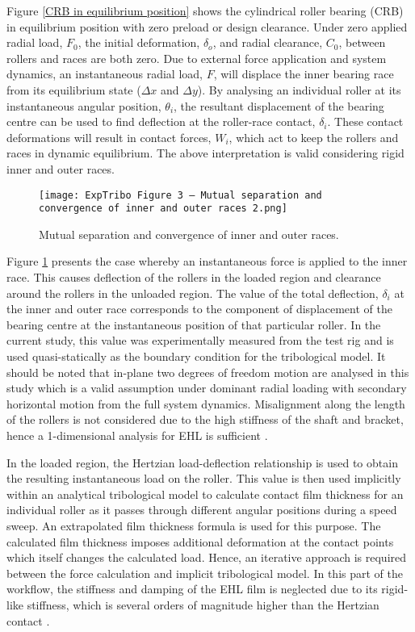 Figure \ref{CRB in equilibrium position} shows the cylindrical roller bearing (CRB) in equilibrium position with zero preload or design clearance. Under zero applied radial load, $F_0$, the initial deformation, $\delta_o$, and radial clearance, $C_0$, between rollers and races are both zero. Due to external force application and system dynamics, an instantaneous radial load, $F$, will displace the inner bearing race from its equilibrium state ($\Delta x$ and $\Delta y$). By analysing an individual roller at its instantaneous angular position, $\theta_i$, the resultant displacement of the bearing centre can be used to find deflection at the roller-race contact, $\delta_i$. These contact deformations will result in contact forces, $W_i$, which act to keep the rollers and races in dynamic equilibrium. The above interpretation is valid considering rigid inner and outer races.

\begin{figure}
	\centerline{\texttt{[image: ExpTribo Figure 3 – Mutual separation and convergence of inner and outer races 2.png]}}
	\caption{Mutual separation and convergence of inner and outer races.}
	\label{Mutual separation and convergence of inner and outer races}
\end{figure}

Figure \ref{Mutual separation and convergence of inner and outer races} presents the case whereby an instantaneous force is applied to the inner race. This causes deflection of the rollers in the loaded region and clearance around the rollers in the unloaded region. The value of the total deflection, $\delta_i$ at the inner and outer race corresponds to the component of displacement of the bearing centre at the instantaneous position of that particular roller. In the current study, this value was experimentally measured from the test rig and is used quasi-statically as the boundary condition for the tribological model. It should be noted that in-plane two degrees of freedom motion are analysed in this study which is a valid assumption under dominant radial loading with secondary horizontal motion from the full system dynamics. Misalignment along the length of the rollers is not considered due to the high stiffness of the shaft and bracket, hence a 1-dimensional analysis for EHL is sufficient \cite{Gupta1979}.

In the loaded region, the Hertzian load-deflection relationship is used to obtain the resulting instantaneous load on the roller. This value is then used implicitly within an analytical tribological model to calculate contact film thickness for an individual roller as it passes through different angular positions during a speed sweep. An extrapolated film thickness formula is used for this purpose. The calculated film thickness imposes additional deformation at the contact points which itself changes the calculated load. Hence, an iterative approach is required between the force calculation and implicit tribological model. In this part of the workflow, the stiffness and damping of the EHL film is neglected due to its rigid-like stiffness, which is several orders of magnitude higher than the Hertzian contact \cite{Walford1983} \cite{Dareing1975} \cite{Mehdigoli1990}.

